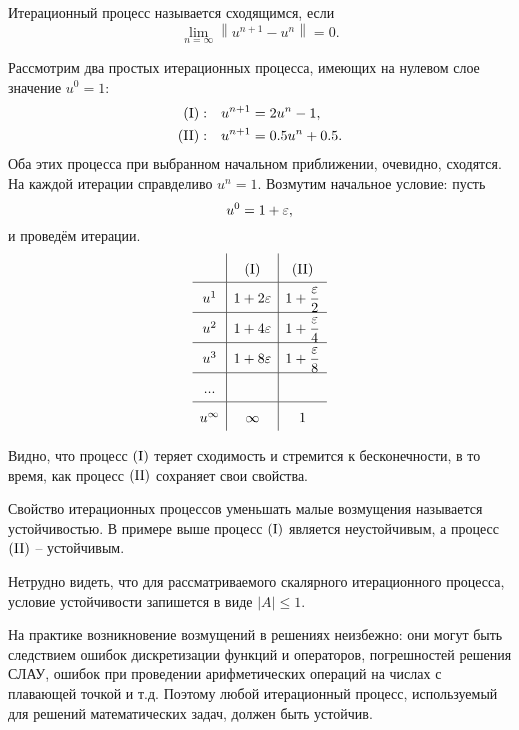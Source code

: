 Итерационный процесс называется сходящимся, если
\begin{equation*}
    \lim_{n=\infty} \left\lVert u^{n+1} - u^{n} \right\rVert = 0.
\end{equation*}

\label{sec:ScalarIter}

Рассмотрим два простых итерационных процесса,
имеющих на нулевом слое значение $u^0 = 1$:
\begin{align*}
    {\rm (I)}:\quad  &u^{n+1} = 2 u^{n} - 1, \\
    {\rm (II)} :\quad  &u^{n+1} = 0.5 u^{n} + 0.5.
\end{align*}
Оба этих процесса при выбранном начальном приближении, очевидно, сходятся.
На каждой итерации справделиво $u^n = 1$.
Возмутим начальное условие: пусть
\begin{equation*}
    u^0 = 1 + \varepsilon,
\end{equation*}
и проведём итерации.
\begin{equation*}
    \def\arraystretch{1.7}
    \begin{array}{c|c|c}
        & {\rm (I)}  &  {\rm (II)} \\
        \hline
        u^1 & 1 + 2\eps & 1 + \dfrac{\eps}{2} \\
        \hline
        u^2 & 1 + 4\eps & 1 + \dfrac{\eps}{4} \\
        \hline
        u^3 & 1 + 8\eps & 1 + \dfrac{\eps}{8} \\
        \hline
        ... & & \\
        \hline
        u^\infty & \infty & 1 \\
    \end{array}
\end{equation*}

Видно, что процесс $\rm (I)$ теряет сходимость и стремится к бесконечности,
в то время, как процесс $\rm (II)$ сохраняет свои свойства.

Свойство итерационных процессов уменьшать малые возмущения называется устойчивостью.
В примере выше процесс $\rm (I)$ является неустойчивым, а процесс $\rm (II)$ -- устойчивым.

Нетрудно видеть, что для рассматриваемого скалярного итерационного процесса,
условие устойчивости запишется в виде $|A| \leq 1$.


На практике возникновение возмущений в решениях неизбежно:
они могут быть следствием ошибок дискретизации функций и операторов,
погрешностей решения СЛАУ, ошибок при проведении арифметических
операций на числах с плавающей точкой и т.д.
Поэтому любой итерационный процесс, используемый для решений
математических задач, должен быть устойчив.

